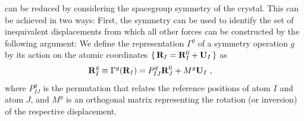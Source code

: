  can be reduced by considering the spacegroup symmetry of the crystal. This can be achieved in two ways: First, the symmetry can be used to identify the set of inequivalent displacements from which all other forces can be constructed by the following argument: We define the representation $\Gamma^g$ of a symmetry operation $g$ by its action on the atomic coordinates $\set{{\bf R}_I = {\bf R}_I^0 + {\bf U}_I}$ as
\begin{align}
	\b R_I^{g} &\equiv {\Gamma}^g (\b R_I) = { P}^g_{IJ} \b R^0_J + { M}^g \b U_I~,
	\label{eq:sym.RI'}
\end{align}	
where $P^g_{IJ}$ is the permutation that relates the reference positions of atom $I$ and atom $J$, and $M^g$ is an orthogonal matrix representing the rotation (or inversion) of the respective displacement. 
